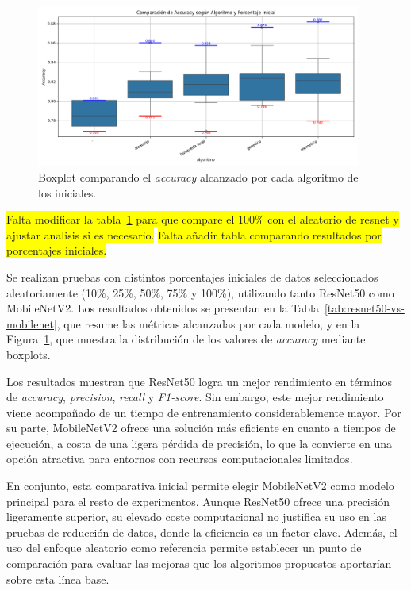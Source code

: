 \begin{figure}[htp]
    \centering
    \includegraphics[width=0.95\textwidth]{imagenes/mobilenet-BOXPLOT-generacion-inicial}
    \caption{Boxplot comparando el \textit{accuracy} alcanzado por cada algoritmo de los iniciales.}
    \label{fig:resnet-boxplot-generacion-inicial}
\end{figure}

\colorbox{yellow}{Falta modificar la tabla~\ref{fig:resnet-boxplot-generacion-inicial} para que compare el 100\% con el aleatorio de resnet y ajustar analisis si es necesario.}
\colorbox{yellow}{Falta añadir tabla comparando resultados por porcentajes iniciales.}

Se realizan pruebas con distintos porcentajes iniciales de datos seleccionados aleatoriamente (10\%, 25\%, 50\%, 75\% y 100\%), utilizando tanto ResNet50 como MobileNetV2.
Los resultados obtenidos se presentan en la Tabla~\ref{tab:resnet50-vs-mobilenet}, que resume las métricas alcanzadas por cada modelo,
y en la Figura~\ref{fig:resnet-boxplot-generacion-inicial}, que muestra la distribución de los valores de \textit{accuracy} mediante boxplots.

Los resultados muestran que ResNet50 logra un mejor rendimiento en términos de \textit{accuracy}, \textit{precision}, \textit{recall} y \textit{F1-score}.
Sin embargo, este mejor rendimiento viene acompañado de un tiempo de entrenamiento considerablemente mayor.
Por su parte, MobileNetV2 ofrece una solución más eficiente en cuanto a tiempos de ejecución, a costa de una ligera pérdida de precisión,
lo que la convierte en una opción atractiva para entornos con recursos computacionales limitados.

En conjunto, esta comparativa inicial permite elegir MobileNetV2 como modelo principal para el resto de experimentos.
Aunque ResNet50 ofrece una precisión ligeramente superior, su elevado coste computacional no justifica su uso en las pruebas de reducción de datos,
donde la eficiencia es un factor clave.
Además, el uso del enfoque aleatorio como referencia permite establecer un punto de comparación para evaluar las mejoras que los algoritmos propuestos aportarían sobre esta línea base.


